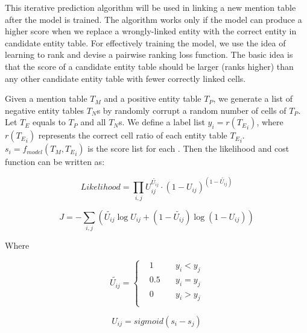 This iterative prediction algorithm will be used in linking a new mention table after the model is trained. The algorithm works only if the model can produce a higher score when we replace a wrongly-linked entity with the correct entity in candidate entity table. For effectively training the model, we use the idea of learning to rank \cite{burges2005learning} and devise a pairwise ranking loss function. 
The basic idea is that the score of a candidate entity table should be larger (ranks higher) than any other candidate entity table with fewer correctly linked cells. 

Given a mention table $T_M$ and a positive entity table $T_P$, we generate a list of negative entity tables $T_N$s by randomly corrupt a random number of cells of $T_P$. Let $T_E$ equals to $T_P$ and all $T_N$s.
We define a label list $y_i = r({T_E}_i)$, where $r({T_E}_i)$ represents the correct cell ratio of each entity table ${T_E}_i$. $s_i = f_{model}(T_M, {T_E}_i)$ is the score list for each .
Then the likelihood and cost function can be written as:

\begin{equation}
\label{eqn:ranknet1}
Likelihood = \prod_{i,j}U_{ij}^{\widetilde{U_{ij}}}\cdot (1-U_{ij})^{(1-\widetilde{U_{ij}})}
\end{equation}

\begin{equation}
\label{eqn:ranknet4}
J = -\sum_{i,j}(\widetilde{U_{ij}} \log U_{ij} + (1-\widetilde{U_{ij}}) \log (1-U_{ij}))
\end{equation}

Where

\begin{equation}
\widetilde{U_{ij}} = \left\{
\begin{aligned}
& 1 & ~ & y_i < y_j \\
& 0.5 & ~ & y_i = y_j \\
& 0 & ~ & y_i > y_j \\
\end{aligned}
\right.
\end{equation}

\begin{equation}
U_{ij} = sigmoid(s_i-s_j)
\end{equation}




